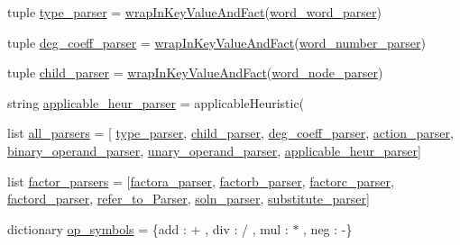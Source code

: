 \begin{DoxyCompactItemize}
\item 
tuple \hyperlink{namespaceeqn__viz_a80772625f40909e83c3baefb38694d27}{type\+\_\+parser} = \hyperlink{namespaceeqn__viz_aff7c3fc95453270d356d2c9fef5be210}{wrap\+In\+Key\+Value\+And\+Fact}(\hyperlink{namespaceeqn__viz_aaabd8c0ea3860c55e9022abed90dab61}{word\+\_\+word\+\_\+parser})
\item 
tuple \hyperlink{namespaceeqn__viz_aa7fc0cae83db0b5d1e6d5c5842cea401}{deg\+\_\+coeff\+\_\+parser} = \hyperlink{namespaceeqn__viz_aff7c3fc95453270d356d2c9fef5be210}{wrap\+In\+Key\+Value\+And\+Fact}(\hyperlink{namespaceeqn__viz_a125896c7d7db5d4f150b2b6699176c2a}{word\+\_\+number\+\_\+parser})
\item 
tuple \hyperlink{namespaceeqn__viz_a333b4ac72b3d28145584b60f44dc5230}{child\+\_\+parser} = \hyperlink{namespaceeqn__viz_aff7c3fc95453270d356d2c9fef5be210}{wrap\+In\+Key\+Value\+And\+Fact}(\hyperlink{namespaceeqn__viz_ade698a80074d34a48d27d50b0b6faafc}{word\+\_\+node\+\_\+parser})
\item 
string \hyperlink{namespaceeqn__viz_adb85cfac07b72248b7de0626b8e31bff}{applicable\+\_\+heur\+\_\+parser} = \textquotesingle{}applicable\+Heuristic(\textquotesingle{}
\item 
list \hyperlink{namespaceeqn__viz_a7be3eddfb6de11856410a9b26fc4a701}{all\+\_\+parsers} = \mbox{[} \hyperlink{namespaceeqn__viz_a80772625f40909e83c3baefb38694d27}{type\+\_\+parser}, \hyperlink{namespaceeqn__viz_a333b4ac72b3d28145584b60f44dc5230}{child\+\_\+parser}, \hyperlink{namespaceeqn__viz_aa7fc0cae83db0b5d1e6d5c5842cea401}{deg\+\_\+coeff\+\_\+parser}, \hyperlink{namespaceeqn__viz_ab821f1efc209d98cc2cbfce1f818acbc}{action\+\_\+parser}, \hyperlink{namespaceeqn__viz_a7a7eda2f6b22edf43034366ee5b0e433}{binary\+\_\+operand\+\_\+parser}, \hyperlink{namespaceeqn__viz_a0eb89bf8984a1b19989d2031cae402a6}{unary\+\_\+operand\+\_\+parser}, \hyperlink{namespaceeqn__viz_adb85cfac07b72248b7de0626b8e31bff}{applicable\+\_\+heur\+\_\+parser}\mbox{]}
\item 
list \hyperlink{namespaceeqn__viz_a87c2b92574d4b106ac2b4a2627a5824b}{factor\+\_\+parsers} = \mbox{[}\hyperlink{namespaceeqn__viz_a854e9036019062010a0620dca4adcf5f}{factora\+\_\+parser}, \hyperlink{namespaceeqn__viz_a830b341130da6861c90efd9ac0858486}{factorb\+\_\+parser}, \hyperlink{namespaceeqn__viz_addfe6dbd1f7e4817decc2f392291d743}{factorc\+\_\+parser}, \hyperlink{namespaceeqn__viz_a17e1b80ac39bb02b3448c7cc9e5e7821}{factord\+\_\+parser}, \hyperlink{namespaceeqn__viz_a28dbd804760bc7a217c14254976e5575}{refer\+\_\+to\+\_\+\+Parser}, \hyperlink{namespaceeqn__viz_ab4bb266f8ba35459c0d095bcffadbad4}{soln\+\_\+parser}, \hyperlink{namespaceeqn__viz_aacd332e3c02218eb9ae4ec66a3e31fd0}{substitute\+\_\+parser}\mbox{]}
\item 
dictionary \hyperlink{namespaceeqn__viz_a9377a4d68a694cfe5b8fd887d7d4f045}{op\+\_\+symbols} = \{\textquotesingle{}add\textquotesingle{} \+: \textquotesingle{}+\textquotesingle{} , \textquotesingle{}div\textquotesingle{} \+: \textquotesingle{}/\textquotesingle{} , \textquotesingle{}mul\textquotesingle{} \+: \textquotesingle{}$\ast$\textquotesingle{} , \textquotesingle{}neg\textquotesingle{} \+: \textquotesingle{}-\/\textquotesingle{}\}
\end{DoxyCompactItemize}


